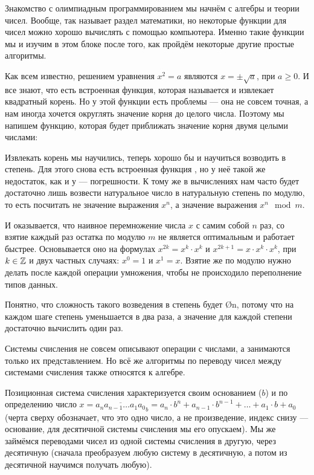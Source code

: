 Знакомство с олимпиадным программированием мы начнём с алгебры и теории чисел. Вообще, так называет раздел математики, но некоторые функции для чисел можно хорошо вычислять с помощью компьютера. Именно такие функции мы и изучим в этом блоке после того, как пройдём некоторые другие простые алгоритмы.


Как всем известно, решением уравнения $x^2 = a$ являются $x = \pm \sqrt{a}$, при $a \geq 0$. И все знают, что есть встроенная функция, которая называется  и извлекает квадратный корень. Но у этой функции есть проблемы — она не совсем точная, а нам иногда хочется округлять значение корня до целого числа. Поэтому мы напишем функцию, которая будет приближать значение корня двумя целыми числами:


Извлекать корень мы научились, теперь хорошо бы и научиться возводить в степень. Для этого снова есть встроенная функция , но у неё такой же недостаток, как и у  — погрешности. К тому же в вычислениях нам часто будет достаточно лишь возвести натуральное число в натуральную степень по модулю, то есть посчитать не значение выражения $x^n$, а значение выражения $x^n \mod m$.

И оказывается, что наивное перемножение числа $x$ с самим собой $n$ раз, со взятие каждый раз остатка по модулю $m$ не является оптимальным и  работает быстрее. Основывается оно на формулах $x^{2k} = x^k \cdot x^k$ и $x^{2k + 1} = x \cdot x^k \cdot x^k$, при $k \in \mathbb{Z}$ и двух частных случаях: $x^0 = 1$ и $x^1 = x$. Взятие же по модулю нужно делать после каждой операции умножения, чтобы не происходило переполнение типов данных.

Понятно, что сложность такого возведения в степень будет \O{\log n}, потому что на каждом шаге степень уменьшается в два раза, а значение для каждой степени достаточно вычислить один раз.


Системы счисления не совсем описывают операции с числами, а занимаются только их представлением. Но всё же алгоритмы по переводу чисел между системами счисления также относятся к алгебре.

Позиционная система счисления характеризуется своим основанием ($b$) и по определению число $x = \overline{a_n a_{n - 1} \ldots a_1 a_0}_b = a_n \cdot b^n + a_{n - 1} \cdot b^{n - 1} + \ldots + a_1 \cdot b + a_0$ (черта сверху обозначает, что это одно число, а не произведение, индекс снизу — основание, для десятичной системы счисления мы его опускаем). Мы же займёмся переводами чисел из одной системы счисления в другую, через десятичную (сначала преобразуем любую систему в десятичную, а потом из десятичной научимся получать любую).

